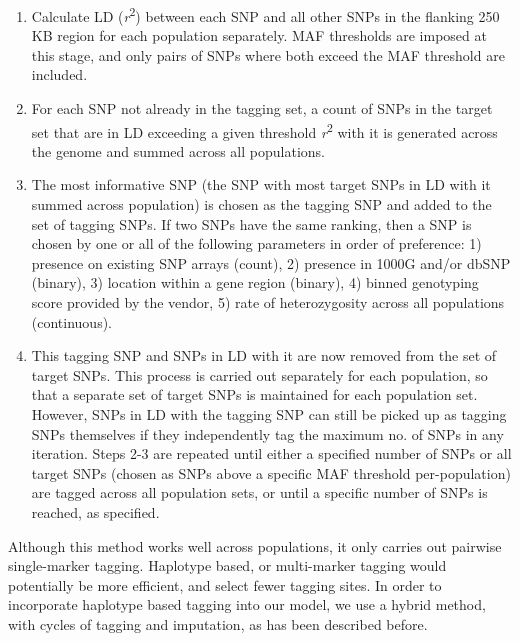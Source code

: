 \begin{enumerate}
\item Calculate LD (\textit{r}\textsuperscript{2}) between each SNP and all other SNPs in the flanking 250 KB region for each population separately. MAF thresholds are imposed at this stage, and only pairs of SNPs where both exceed the MAF threshold are included.
\item For each SNP not already in the tagging set, a count of SNPs in the target set that are in LD exceeding a given threshold \textit{r}\textsuperscript{2} with it is generated across the genome and summed across all populations.
\item The most informative SNP (the SNP with most target SNPs in LD with it summed across population) is chosen as the tagging SNP and added to the set of tagging SNPs. If two SNPs have the same ranking, then a SNP is chosen by one or all of the following parameters in order of preference: 1) presence on existing SNP arrays (count), 2) presence in 1000G and/or dbSNP (binary), 3) location within a gene region (binary), 4) binned genotyping score provided by the vendor, 5) rate of heterozygosity across all populations (continuous).
\item This tagging SNP and SNPs in LD with it are now removed from the set of target SNPs. This process is carried out separately for each population, so that a separate set of target SNPs is maintained for each population set. However, SNPs in LD with the tagging SNP can still be picked up as tagging SNPs themselves if they independently tag the maximum no. of SNPs in any iteration.
Steps 2-3 are repeated until either a specified number of SNPs or all target SNPs (chosen as SNPs above a specific MAF threshold per-population) are tagged across all population sets, or until a specific number of SNPs is reached, as specified.
\end{enumerate}

Although this method works well across populations, it only carries out pairwise single-marker tagging. Haplotype based, or multi-marker tagging would potentially be more efficient, and select fewer tagging sites. In order to incorporate haplotype based tagging into our model, we use a hybrid method, with cycles of tagging and imputation, as has been described before.\cite{Hoffmann2011422}

